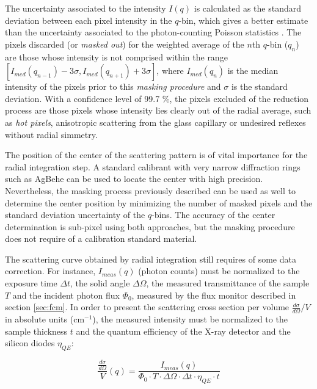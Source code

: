 The uncertainty associated to the intensity $I(q)$ is calculated as the standard deviation between each pixel intensity in the $q$-bin, which gives a better estimate than the uncertainty associated to the photon-counting Poisson statistics \citep{pauw_everything_2013}. The pixels discarded (or \emph{masked out}) for the weighted average of the $n$th $q$-bin ($q_n$) are those whose intensity is not comprised within the range $\left[ I_{med}\left( q_{n-1}\right)- 3 \sigma , I_{med}\left( q_{n+1}\right) + 3 \sigma \right]$, where $I_{med}\left( q_{n}\right)$ is the median intensity of the pixels prior to this \emph{masking procedure} and $\sigma$ is the standard deviation. With a confidence level of 99.7 $\%$, the pixels excluded of the reduction process are those pixels whose intensity lies clearly out of the radial average, such as \emph{hot pixels}, anisotropic scattering from the glass capillary or undesired reflexes without radial simmetry.

The position of the center of the scattering pattern is of vital importance for the radial integration step. A standard calibrant with very narrow diffraction rings such as AgBehe can be used to locate the center with high precision. Nevertheless, the masking process previously described can be used as well to determine the center position by minimizing the number of masked pixels and the standard deviation uncertainty of the $q$-bins. The accuracy of the center determination is sub-pixel using both approaches, but the masking procedure does not require of a calibration standard material.

The scattering curve obtained by radial integration still requires of some data correction. For instance, $I_{meas}(q)$ (photon counts) must be normalized to the exposure time $\Delta t$, the solid angle $\Delta \Omega$, the measured transmittance of the sample $T$ and the incident photon flux $\Phi_0$, measured by the flux monitor described in section \ref{sec:fcm}. In order to present the scattering cross section per volume $\frac{d\sigma}{d\Omega}/V$ in absolute units (cm$^{-1}$), the measured intensity must be normalized to the sample thickness $t$ and the quantum efficiency of the X-ray detector and the silicon diodes $\eta_{QE}$: 

\begin{equation}
\frac{\frac{d\sigma}{d\Omega}}{V} \left(q\right)=\frac{I_{meas}\left(q\right)}{\Phi_0 \cdot T \cdot \Delta\Omega \cdot \Delta t \cdot \eta_{QE} \cdot t}
\end{equation}

